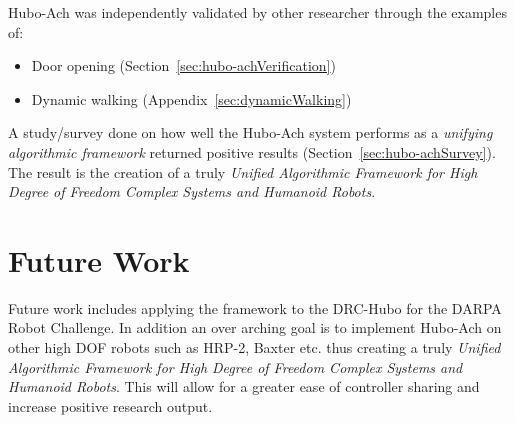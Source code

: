 Hubo-Ach was independently validated by other researcher through the examples of:
\begin{itemize}
	\item Door opening (Section~\ref{sec:hubo-achVerification})
	\item Dynamic walking (Appendix~\ref{sec:dynamicWalking})
\end{itemize}

A study/survey done on how well the Hubo-Ach system performs as a \textit{unifying algorithmic framework} returned positive results (Section~\ref{sec:hubo-achSurvey}).
The result is the creation of a truly \textit{Unified Algorithmic Framework for High Degree of Freedom Complex Systems and Humanoid Robots}.

\section{Future Work}
Future work includes applying the framework to the DRC-Hubo for the DARPA Robot Challenge.
In addition an over arching goal is to implement Hubo-Ach on other high DOF robots such as HRP-2, Baxter etc. thus creating a truly \textit{Unified Algorithmic Framework for High Degree of Freedom Complex Systems and Humanoid Robots}.
This will allow for a greater ease of controller sharing and increase positive research output.




